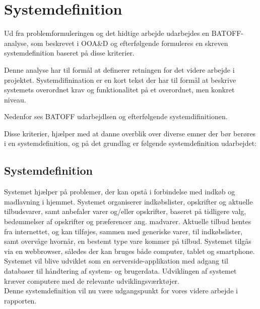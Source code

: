 \chapter{Systemdefinition}
Ud fra problemformuleringen og det hidtige arbejde udarbejdes en BATOFF-analyse, som beskrevet i OOA\&D\citep{OOA&D2001} og efterfølgende formuleres en skreven systemdefinition baseret på disse kriterier.

Denne analyse har til formål at definerer retningen for det videre arbejde i projektet.
Systemdifinination er en kort tekst der har til formål at beskrive systemets overordnet krav og funktionalitet på et overordnet, men konkret niveau.

Nedenfor ses BATOFF udarbejdlsen og efterfølgende systemdifinitionen.



Disse kriterier, hjælper med at danne overblik over diverse emner der bør berøres i en systemdefinition, og på det grundlag er følgende systemdefinition udarbejdet:

\section{Systemdefinition}

Systemet hjælper på problemer, der kan opstå i forbindelse med indkøb og madlavning i hjemmet. 
Systemet organiserer indkøbslister, opskrifter og aktuelle tilbudsvarer, samt anbefaler varer og/eller opskrifter, baseret på tidligere valg, bedømmelser af opskrifter og præferencer ang. madvarer. 
Aktuelle tilbud hentes fra internettet, og kan tilføjes, sammen med generiske varer, til indkøbslister, samt overvåge hvornår, en bestemt type vare kommer på tilbud.
Systemet tilgås via en webbrowser, således der kan bruges både computer, tablet og smartphone. 
Systemet vil blive udviklet som en serverside-applikation med adgang til databaser til håndtering af system- og brugerdata. 
Udviklingen af systemet kræver computere med de relevante udviklingsværktøjer.\\

Denne systemdefinition vil nu være udgangspunkt for vores videre arbejde i rapporten.